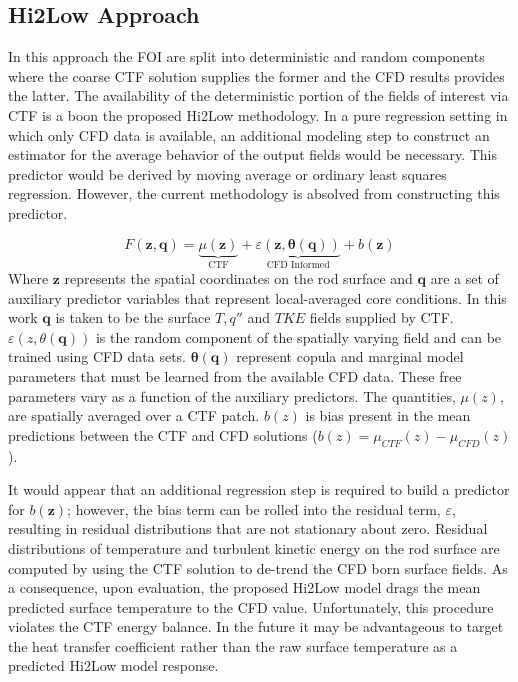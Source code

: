 \subsection{Hi2Low Approach}

In this approach the FOI are split into deterministic and random components where the coarse CTF solution supplies the former and the CFD results provides the latter.
The availability of the deterministic portion of the fields of interest via CTF is a boon the proposed Hi2Low methodology.  In a pure regression setting in which only CFD data is available, an additional modeling step to construct an estimator for the average behavior of the output fields would be necessary.  This predictor would be derived by moving average or ordinary least squares regression.  However, the current methodology is absolved from constructing this predictor.

\begin{equation}
    F(\mathbf z, \mathbf q) = \underbrace{\mu(\mathbf{z})}_\text{CTF} + \underbrace{\varepsilon({\mathbf z, \mathbf \theta(\mathbf q)})}_\text{CFD Informed} + b(\mathbf{z})
\end{equation}
Where $\mathbf z$ represents the spatial coordinates on the rod surface and $\mathbf q$ are a set of auxiliary predictor variables that represent local-averaged core conditions.  In this work $\mathbf q$ is taken to be the surface $T, q''$ and $TKE$ fields supplied by CTF. $\varepsilon(z, \theta(\mathbf q))$ is the random component of the spatially varying field and can be trained using CFD data sets.  $\mathbf \theta(\mathbf q)$ represent copula and marginal model parameters that must be learned from the available CFD data.  These free parameters vary as a function of the auxiliary predictors.
 The quantities, $\mu(z)$, are spatially averaged over a CTF patch.
$b(z)$ is bias present in the mean predictions between the CTF and CFD solutions ($b(z) = \mu_{CTF}(z) - \mu_{CFD}(z)$).

It would appear that an additional regression step is required to build a predictor for $b(\mathbf{z})$; however, the bias term can be rolled into the residual term, $\varepsilon$, resulting in residual distributions that are not stationary about zero.
Residual distributions of temperature and turbulent kinetic energy on the rod surface are computed by using the CTF solution to de-trend the CFD born surface fields.  As a consequence, upon evaluation, the proposed Hi2Low model drags the mean predicted surface temperature to the CFD value.  Unfortunately, this procedure violates the CTF energy balance.  In the future it may be advantageous to target the heat transfer coefficient rather than the raw surface temperature as a predicted Hi2Low model response.


